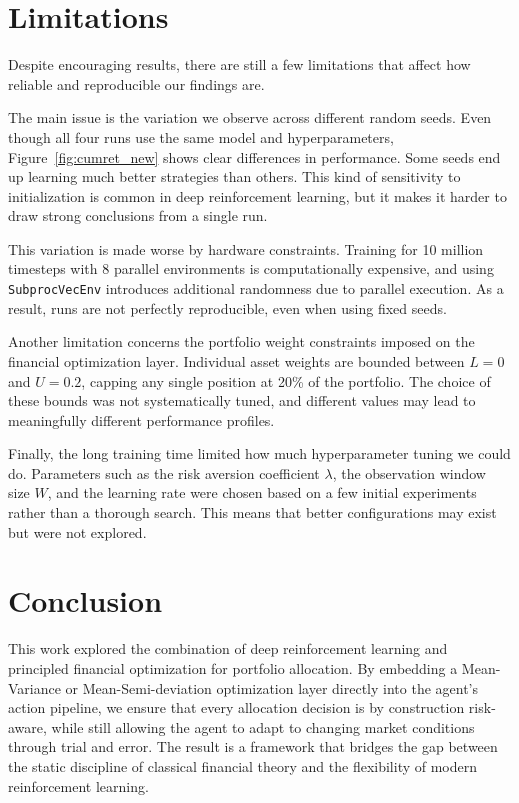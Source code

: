 \documentclass[final]{article}
\begin{document}
\section{Limitations}
\label{sec:limitations}

Despite encouraging results, there are still a few limitations that affect how reliable and reproducible our findings are.

The main issue is the variation we observe across different random seeds. Even though all four runs use the same model
and hyperparameters, Figure~\ref{fig:cumret_new} shows clear differences in performance. Some seeds end up learning much
better strategies than others. This kind of sensitivity to initialization is common in deep reinforcement learning, but
it makes it harder to draw strong conclusions from a single run.

This variation is made worse by hardware constraints. Training for 10 million timesteps with 8 parallel environments is
computationally expensive, and using \texttt{SubprocVecEnv} introduces additional randomness due to parallel execution.
As a result, runs are not perfectly reproducible, even when using fixed seeds.

Another limitation concerns the portfolio weight constraints imposed on the financial optimization layer. Individual
asset weights are bounded between $L = 0$ and $U = 0.2$, capping any single position at 20\% of the portfolio. The
choice of these bounds was not systematically tuned, and different values may lead to meaningfully different
performance profiles.

Finally, the long training time limited how much hyperparameter tuning we could do. Parameters such as the risk aversion
coefficient $\lambda$, the observation window size $W$, and the learning rate were chosen based on a few initial
experiments rather than a thorough search. This means that better configurations may exist but were not explored.

\section{Conclusion}
\label{sec:conclusion}
This work explored the combination of deep reinforcement learning and principled financial optimization for portfolio
allocation. By embedding a Mean-Variance or  Mean-Semi-deviation optimization layer directly into the agent's action
pipeline, we ensure that every allocation decision is by construction risk-aware, while still allowing the agent to adapt
to changing market conditions through trial and error. The result is a framework that bridges the gap between the static
discipline of classical financial theory and the flexibility of modern reinforcement learning.
\end{document}
